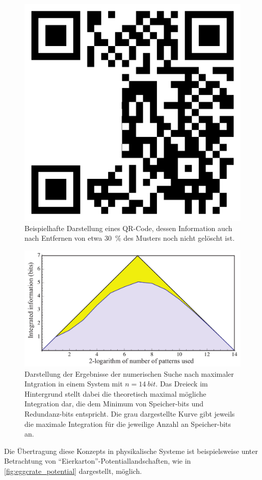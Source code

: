 \begin{figure}
	\centering
	\includegraphics[scale=0.15]{graphics/qrcode_damaged.jpg}
	\caption{Beispielhafte Darstellung eines QR-Code, dessen Information auch nach Entfernen von etwa 
		\SI{30}{\percent} des Musters noch nicht gelöscht ist.\label{fig:neuronqrcode}}
\end{figure}  
\begin{figure}
	\centering
	\includegraphics[scale=0.25]{graphics/integrated_information_graph.jpg}
	\caption{Darstellung der Ergebnisse der numerischen Suche nach maximaler Intgration in einem System 
		mit $n = \SI{14}{bit}$. Das Dreieck im Hintergrund stellt dabei die theoretisch maximal mögliche 
		Integration dar, die dem Minimum von Speicher-bits und Redundanz-bits entspricht. Die grau dargestellte
		Kurve gibt jeweils die maximale Integration für die jeweilige Anzahl an Speicher-bits an. \label{fig:maximal_integrated_information}}
\end{figure}  

Die Übertragung diese Konzepts in physikalische Systeme ist beispielsweise unter Betrachtung von 
\enquote{Eierkarton}-Potentiallandschaften, wie in \cref{fig:eggcrate_potential} dargestellt, möglich.
  





